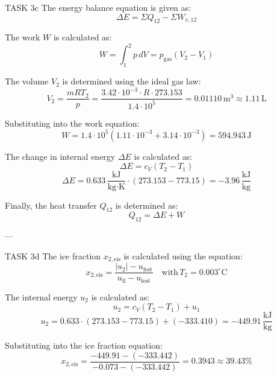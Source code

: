 TASK 3c  
The energy balance equation is given as:  
\[
\Delta E = \Sigma Q_{12} - \Sigma W_{v,12}
\]  

The work \( W \) is calculated as:  
\[
W = \int_{1}^{2} p \, dV = p_{\text{gas}} (V_2 - V_1)
\]  

The volume \( V_2 \) is determined using the ideal gas law:  
\[
V_2 = \frac{mRT_2}{p} = \frac{3.42 \cdot 10^{-3} \cdot R \cdot 273.153}{1.4 \cdot 10^5} = 0.01110 \, \text{m}^3 \approx 1.11 \, \text{L}
\]  

Substituting into the work equation:  
\[
W = 1.4 \cdot 10^5 \left( 1.11 \cdot 10^{-3} + 3.14 \cdot 10^{-3} \right) = 594.943 \, \text{J}
\]  

The change in internal energy \( \Delta E \) is calculated as:  
\[
\Delta E = c_V (T_2 - T_1)
\]  
\[
\Delta E = 0.633 \, \frac{\text{kJ}}{\text{kg·K}} \cdot (273.153 - 773.15) = -3.96 \, \frac{\text{kJ}}{\text{kg}}
\]  

Finally, the heat transfer \( Q_{12} \) is determined as:  
\[
Q_{12} = \Delta E + W
\]  

---

TASK 3d  
The ice fraction \( x_{2,\text{eis}} \) is calculated using the equation:  
\[
x_{2,\text{eis}} = \frac{|u_2| - u_{\text{fest}}}{u_{\text{fl}} - u_{\text{fest}}} \quad \text{with} \, T_2 = 0.003^\circ\text{C}
\]  

The internal energy \( u_2 \) is calculated as:  
\[
u_2 = c_V (T_2 - T_1) + u_1
\]  
\[
u_2 = 0.633 \cdot (273.153 - 773.15) + (-333.410) = -449.91 \, \frac{\text{kJ}}{\text{kg}}
\]  

Substituting into the ice fraction equation:  
\[
x_{2,\text{eis}} = \frac{-449.91 - (-333.442)}{-0.073 - (-333.442)} = 0.3943 \approx 39.43\%
\]  

